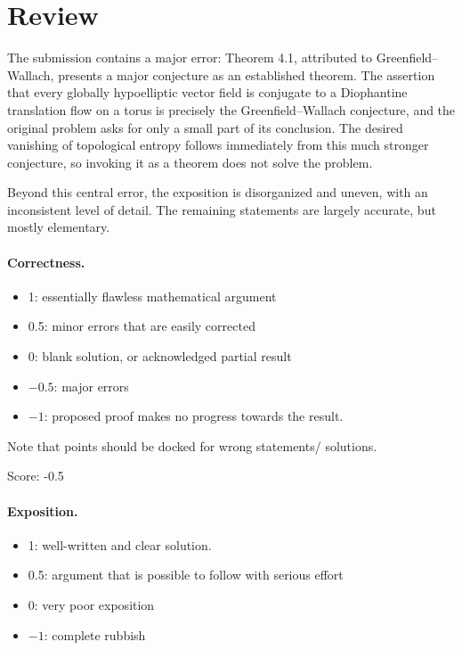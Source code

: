 \documentclass[11pt]{article}
\theoremstyle{definition}
\begin{document}
\maketitle

\section{Review}
{\color{gray} The submission contains a major error: Theorem 4.1, attributed to Greenfield--Wallach, presents a major conjecture as an established theorem. The assertion that every globally hypoelliptic vector field is conjugate to a Diophantine translation flow on a torus is precisely the Greenfield--Wallach conjecture, and the original problem asks for only a small part of its conclusion. The desired vanishing of topological entropy follows immediately from this much stronger conjecture, so invoking it as a theorem does not solve the problem.

Beyond this central error, the exposition is disorganized and uneven, with an inconsistent level of detail. The remaining statements are largely accurate, but mostly elementary.}

\paragraph{Correctness.}
\begin{itemize}
	\item  1: essentially flawless mathematical argument
	\item  0.5: minor errors that are easily corrected
	\item  0: blank solution, or acknowledged partial result
	\item  $-0.5$: major errors
	\item  $-1$: proposed proof makes no progress towards the result.
\end{itemize}
Note that points should be docked for wrong statements/ solutions.

\noindent Score: -0.5

\paragraph{Exposition.}
\begin{itemize}
	\item  1: well-written and clear solution.
	\item  0.5: argument that is possible to follow with serious effort
	\item  0: very poor exposition
	\item  $-1$: complete rubbish
\end{itemize}
\end{document}
